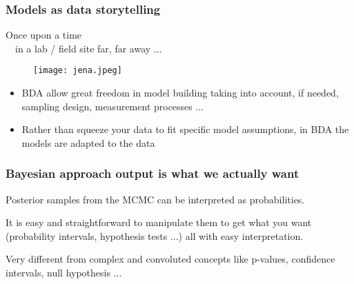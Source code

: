 \documentclass{beamer}
\begin{document}
 \begin{frame}
  \frametitle{\bf Models as data storytelling}
  \begin{center}
   \calligra Once upon a time\\
  \-\ \-\ in a lab / field site far, far away ...
  \end{center}
  
  \begin{figure}
   \texttt{[image: jena.jpeg]}
  \end{figure}

  \begin{itemize}
   \small
   \item BDA allow great freedom in model building taking into account, if needed, sampling design, measurement processes ...
   \item Rather than squeeze your data to fit specific model assumptions, in BDA the models are adapted to the data
  \end{itemize}

  
 \end{frame}

 
  \begin{frame}
  \frametitle{\bf Bayesian approach output is what we actually want}
  
  Posterior samples from the MCMC can be interpreted as probabilities.\\
  
  \vspace*{0.3cm}
  
  It is easy and straightforward to manipulate them to get what you want (probability intervals, hypothesis tests ...) all with easy interpretation.\\
  
  \vspace*{0.3cm}
  
  Very different from complex and convoluted concepts like p-values, confidence intervals, null hypothesis ...
  
  
 \end{frame}
 
\end{document}
